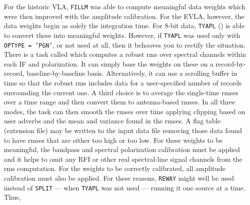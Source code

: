 For the historic VLA, {\tt FILLM} was able to compute meaningful data
weights which were then improved with the amplitude calibration.  For
the EVLA, however, the data weights begin as solely the integration
time.  For 8-bit data, {\tt TYAPL} () is able to convert
these into meaningful weights.  However, if {\tt TYAPL} was used only
with {\tt OPTYPE = 'PGN'}, or not used at all, then it behooves you to
rectify the situation.  There is a task called {\tt {}}
which computes a robust rms over spectral channels within each IF and
polarization.  It can simply base the weights on these on a
record-by-record, baseline-by-baseline basis.  Alternatively, it can
use a scrolling buffer in time so that the robust rms includes data
for a user-specified number of records surrounding the current one.  A
third choice is to average the single-time rmses over a time range and
then convert them to antenna-based rmses.  In all three modes, the
task can then smooth the rmses over time applying clipping based on
user adverbs and the mean and variance found in the rmses.  A flag
table (extension file) may be written to the input data file removing
those data found to have rmses that are either too high or too low.
For these weights to be meaningful, the bandpass and spectral
polarization calibration must be applied and it helps to omit any RFI
or other real spectral-line signal channels from the rms computation.
For the weights to be correctly calibrated, all amplitude calibration
must also be applied.  For these reasons, {\tt REWAY} might well be
used instead of {\tt SPLIT} --- when {\tt TYAPL} was not used ---
running it one source at a time.  Thus,

